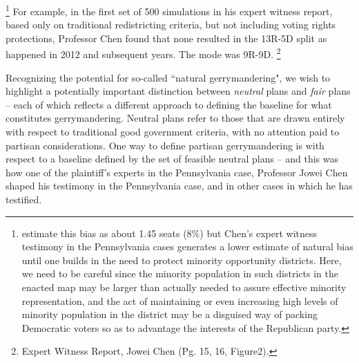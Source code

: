     \footnote{\citet{Chen2013} estimate this bias as about 1.45 seats (8\%) but Chen’s expert witness testimony in the Pennsylvania cases generates a lower estimate of natural bias until one builds in the need to protect minority opportunity districts. Here, we need to be careful since the minority population in such districts in the enacted map may be larger than actually needed to assure effective minority representation, and the act of  maintaining or even increasing high levels of minority population in the district may be a disguised way of packing Democratic voters so as to advantage the interests of the Republican party.}
    For example, in the first set of 500 simulations in his expert witness report, based only on traditional redistricting criteria, but not including voting rights protections, Professor Chen found that none resulted in the 13R-5D split as happened in 2012 and subsequent years. The mode was 9R-9D.  
    \footnote{Expert Witness Report, Jowei Chen (Pg. 15, 16, Figure2).}
\par
    Recognizing the potential for so-called ``natural gerrymandering", we wish to highlight a potentially important distinction between \textit{neutral} plans and \textit{fair} plans -- each of which reflects a different approach to defining the baseline for what constitutes gerrymandering. Neutral plans refer to those that are drawn entirely with respect to traditional good government criteria, with no attention paid to partisan considerations. One way to define partisan gerrymandering is with respect to a baseline defined by the set of feasible neutral plans -- and this was how one of the plaintiff’s experts in the Pennsylvania case, Professor Jowei Chen \citep[cf.][]{Chen2013} shaped his testimony in the Pennsylvania case, and in other cases in which he has testified.
